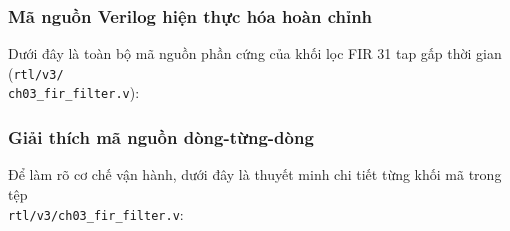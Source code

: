 \subsubsection*{Mã nguồn Verilog hiện thực hóa hoàn chỉnh}
Dưới đây là toàn bộ mã nguồn phần cứng của khối lọc FIR 31 tap gấp thời gian (\texttt{rtl/v3/}\\ \texttt{ch03\_fir\_filter.v}):



\subsubsection*{Giải thích mã nguồn dòng-từng-dòng}
Để làm rõ cơ chế vận hành, dưới đây là thuyết minh chi tiết từng khối mã trong tệp\\ \texttt{rtl/v3/ch03\_fir\_filter.v}:
